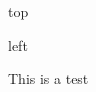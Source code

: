 \documentclass[11pt,letterpaper,sans]{moderncv}
\begin{document}
\begin{staticcontents*}{top}
\makecvtitle
\end{staticcontents*}

\begin{staticcontents*}{left}
\raggedright This is a test
\end{staticcontents*}


\vspace{0.2em}



%

%

%
\end{document}
